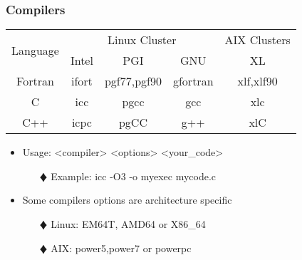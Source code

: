 \documentclass[slidestop,mathserif,compress,xcolor=svgnames,table]{beamer}
\newenvironment{bblock}[0]
{
\begin{beamerboxesrounded}[upper=uppercol1,lower=lowercol1,shadow=true]}
{\end{beamerboxesrounded}}
\begin{document}
\begin{frame}
  \frametitle{\small Compilers}
  \begin{bblock}{}
    \begin{center}
      \begin{tabular}{|c|c|c|c|c|}
	\hline
	\multirow{2}{*}{Language} & \multicolumn{3}{c|}{Linux Cluster} & AIX Clusters\\
	\cline{2-5}
	& Intel & PGI & GNU & XL \\
	\hline
	Fortran & ifort & pgf77,pgf90 & gfortran & xlf,xlf90\\\hline
	C & icc & pgcc & gcc & xlc\\\hline
	C++ & icpc & pgCC & g++ & xlC\\
	\hline
      \end{tabular}
    \end{center}
  \end{bblock}
  \begin{itemize}
    \item Usage: <compiler> <options> <your\_code>
    \begin{enumerate}
      \item[$\vardiamond$] Example: icc -O3 -o myexec mycode.c
    \end{enumerate}
    \item Some compilers options are architecture specific
    \begin{enumerate}
      \item[$\vardiamond$] Linux: EM64T, AMD64 or X86\_64
      \item[$\vardiamond$] AIX: power5,power7 or powerpc
    \end{enumerate}
  \end{itemize}
\end{frame}
\end{document}
